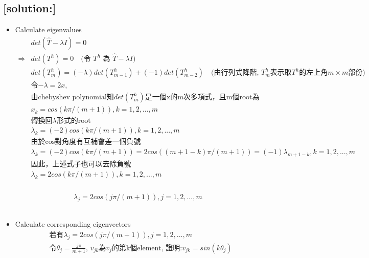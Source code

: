\documentclass[12pt]{article}
\begin{document}
        \subsection*{[solution:]}
                \begin{itemize}
                    \item Calculate eigenvalues
                        \[
                            \begin{aligned}
                                &det(\hat{T}-\lambda I)=0\\
                    \Rightarrow &det(T^h)=0 \quad \text{(令 $T^h$ 為 $\hat{T}-\lambda I$)}\\
                                &det(T^h_m)=(-\lambda)det(T^h_{m-1})+(-1)det(T^h_{m-2}) \quad \text{(由行列式降階, $T^h_m$表示取$T^h$的左上角$m \times m$部份)}\\
    &\text{令$-\lambda=2x$,} \\
    &\text{由chebyshev polynomial知$det(T^h_m)$是一個x的m次多項式，且m個root為}\\
                                &x_k = cos(k\pi/(m+1)), k=1,2,...,m\\
    &\text{轉換回$\lambda$形式的root}\\
                                &\lambda_k = (-2)cos(k\pi/(m+1)), k=1,2,...,m\\
    &\text{由於cos對角度有互補會差一個負號}\\
                                & \lambda_k = (-2)cos(k\pi/(m+1)) = 2cos((m+1-k)\pi/(m+1)) = (-1)\lambda_{m+1-k}, k=1,2,...,m\\
    &\text{因此，上述式子也可以去除負號}\\
                                &\lambda_k = 2cos(k\pi/(m+1)), k=1,2,...,m\\
                            \end{aligned}
                        \]
                        \\
                                $$\lambda_j = 2cos(j\pi/(m+1)), j=1,2,...,m$$\\
                    \item Calculate corresponding eigenvectors 
                        \[
                            \begin{aligned}
                                &\text{若有$\lambda_j = 2cos(j\pi/(m+1)), j=1,2,...,m$}\\
                                &\text{令$\theta_j = \frac{j\pi}{m+1}$, $v_{jk}$為$v_j$的第k個element, 證明:$v_{jk} = sin(k\theta_j)$}\\

\end{aligned}\]
\end{itemize}
\end{document}
